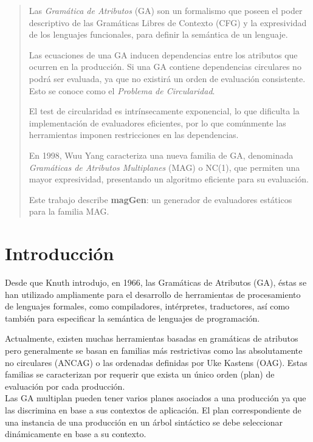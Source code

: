 \documentclass[a4paper]{article}
\newcommand{\maggen}{\textbf{magGen}}
\begin{document}
\begin{abstract}

Las \emph{Gramática de Atributos} (GA) son un formalismo que poseen el poder descriptivo de las Gramáticas Libres de Contexto (CFG) y la expresividad de los lenguajes funcionales, para definir la semántica de un lenguaje.%

Las ecuaciones de una GA inducen dependencias entre los atributos que ocurren en la producción. Si una GA contiene dependencias circulares no podrá ser evaluada, ya que no existirá un orden de evaluación consistente. Esto se conoce como el
\emph{Problema de Circularidad}.%

El test de circularidad es intrínsecamente exponencial, lo que dificulta la implementación de
evaluadores eficientes, por lo que comúnmente las herramientas imponen restricciones en las 
dependencias.

En 1998, Wuu Yang caracteriza una nueva familia de GA, denominada \emph{Gramáticas de
Atributos Multiplanes} (MAG) o NC(1), que permiten una mayor expresividad, presentando un algoritmo eficiente para su evaluación.

Este trabajo describe \maggen: un generador de evaluadores estáticos para la familia MAG.
 
\end{abstract}

\section{Introducción}

Desde que Knuth introdujo, en 1966, las Gramáticas de Atributos (GA)\cite{Knuth}, éstas se han utilizado ampliamente para el desarrollo de herramientas de procesamiento de lenguajes formales, como compiladores, intérpretes, traductores, así  como también para especificar la semántica de lenguajes de programación.

Actualmente, existen muchas herramientas basadas en gramáticas de atributos
pero generalmente se basan en familias más restrictivas como las absolutamente no circulares (ANCAG) o las ordenadas definidas por Uke Kastens (OAG)\cite{tesismarcelo}. 
Estas familias se caracterizan por requerir que exista un único orden (plan) de evaluación 
por cada producción. \\

Las GA multiplan pueden tener varios planes asociados a una producción ya que las discrimina en base a sus contextos de aplicación. El plan correspondiente de una instancia de una producción en un árbol sintáctico se debe seleccionar dinámicamente en base a su contexto.
\end{document}

